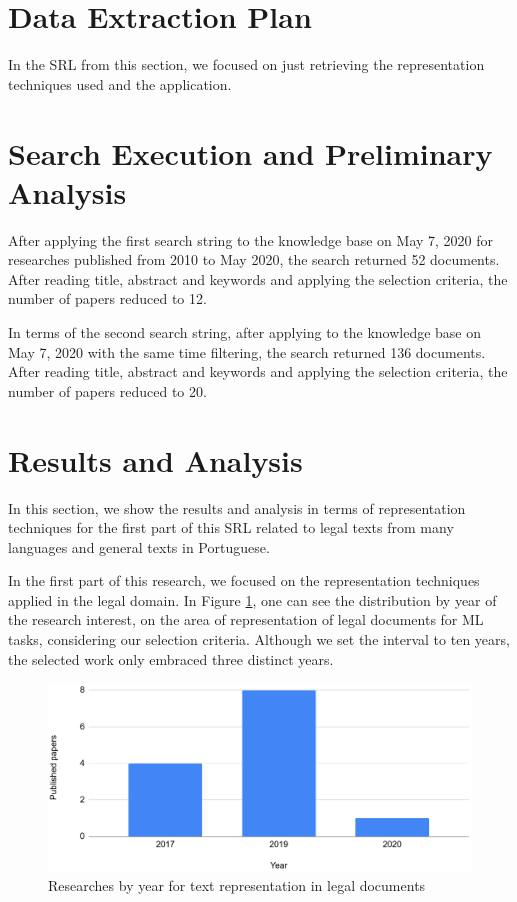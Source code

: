 \section{Data Extraction Plan}

In the SRL from this section, we focused on just retrieving the representation techniques used and the application.

\section{Search Execution and Preliminary Analysis}

After applying the first search string to the knowledge base on May 7, 2020 for researches published from 2010 to May 2020, the search returned 52 documents. After reading title, abstract and keywords and applying the selection criteria, the number of papers reduced to 12.

In terms of the second search string, after applying to the knowledge base on May 7, 2020 with the same time filtering, the search returned 136 documents. After reading title, abstract and keywords and applying the selection criteria, the number of papers reduced to 20.


\section{Results and Analysis}

In this section, we show the results and analysis in terms of representation techniques for the first part of this SRL related to legal texts from many languages and general texts in Portuguese.

In the first part of this research, we focused on the representation techniques applied in the legal domain. In Figure \ref{fig:rsl_legal_representation}, one can see the distribution by year of the research interest, on the area of representation of legal documents for ML tasks, considering our selection criteria. Although we set the interval to ten years, the selected work only embraced three distinct years.


\begin{figure}[htb]
    \centering
    \caption{Researches by year for text representation in legal documents}
    \label{fig:rsl_legal_representation}
    \includegraphics[width=\textwidth]{images/appendix/rsl_legal_representation.png}
\end{figure}

